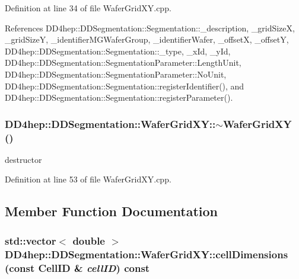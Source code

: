 Definition at line 34 of file WaferGridXY.cpp.

References DD4hep::DDSegmentation::Segmentation::\_\-description, \_\-gridSizeX, \_\-gridSizeY, \_\-identifierMGWaferGroup, \_\-identifierWafer, \_\-offsetX, \_\-offsetY, DD4hep::DDSegmentation::Segmentation::\_\-type, \_\-xId, \_\-yId, DD4hep::DDSegmentation::SegmentationParameter::LengthUnit, DD4hep::DDSegmentation::SegmentationParameter::NoUnit, DD4hep::DDSegmentation::Segmentation::registerIdentifier(), and DD4hep::DDSegmentation::Segmentation::registerParameter().\hypertarget{class_d_d4hep_1_1_d_d_segmentation_1_1_wafer_grid_x_y_a07377755b469f13a9fea18473a39959e}{
\subsubsection[{$\sim$WaferGridXY}]{\setlength{\rightskip}{0pt plus 5cm}DD4hep::DDSegmentation::WaferGridXY::$\sim$WaferGridXY ()}}
\label{class_d_d4hep_1_1_d_d_segmentation_1_1_wafer_grid_x_y_a07377755b469f13a9fea18473a39959e}


destructor 

Definition at line 53 of file WaferGridXY.cpp.

\subsection{Member Function Documentation}
\hypertarget{class_d_d4hep_1_1_d_d_segmentation_1_1_wafer_grid_x_y_ae063a2a9a60e5965a12cc3c18b851dab}{
\subsubsection[{cellDimensions}]{\setlength{\rightskip}{0pt plus 5cm}std::vector$<$ double $>$ DD4hep::DDSegmentation::WaferGridXY::cellDimensions (const {\bf CellID} \& {\em cellID}) const}}
\label{class_d_d4hep_1_1_d_d_segmentation_1_1_wafer_grid_x_y_ae063a2a9a60e5965a12cc3c18b851dab}


